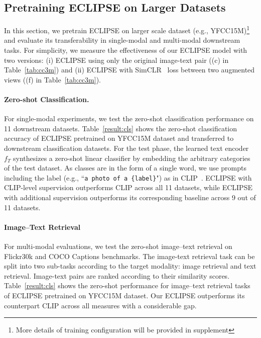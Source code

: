 \subsection{Pretraining ECLIPSE on Larger Datasets}
In this section, we pretrain ECLIPSE on larger scale dataset (e.g., YFCC15M)\footnote{More details of training configuration will be provided in supplement} and evaluate its transferability in single-modal and multi-modal downstream tasks.
For simplicity, we measure the effectiveness of our ECLIPSE model with two versions: (i) ECLIPSE using only the original image-text pair ((c) in Table~\ref{tab:cc3m}) and (ii) ECLIPSE with SimCLR~\cite{chen2020simple} loss between two augmented views ((f) in Table~\ref{tab:cc3m}).

\paragraph{Zero-shot Classification.}
For single-modal experiments, we test the zero-shot classification performance on 11 downstream datasets.
Table~\ref{result:cls} shows the zero-shot classification accuracy of ECLIPSE pretrained on YFCC15M dataset and transferred to downstream classification datasets.
For the test phase, the learned text encoder $f_T$ synthesizes a zero-shot linear classifier by embedding the arbitrary categories of the test dataset.
As classes are in the form of a single word, we use prompts including the label (e.g., ``\texttt{a photo of a \{label\}}") as in CLIP~\cite{radford2021learning}.
ECLIPSE with CLIP-level supervision outperforms CLIP across all 11 datasets, while ECLIPSE with additional supervision outperforms its corresponding baseline across 9 out of 11 datasets.



\paragraph{Image--Text Retrieval}
For multi-modal evaluations, we test the zero-shot image--text retrieval on Flickr30k and COCO Captions benchmarks.
The image-text retrieval task can be split into two sub-tasks according to the target modality: image retrieval and text retrieval.
Image-text pairs are ranked according to their similarity scores.
Table~\ref{result:cls} shows the zero-shot performance for image--text retrieval tasks of ECLIPSE pretrained on YFCC15M dataset.
Our ECLIPSE outperforms its counterpart CLIP across all measures with a considerable gap.

